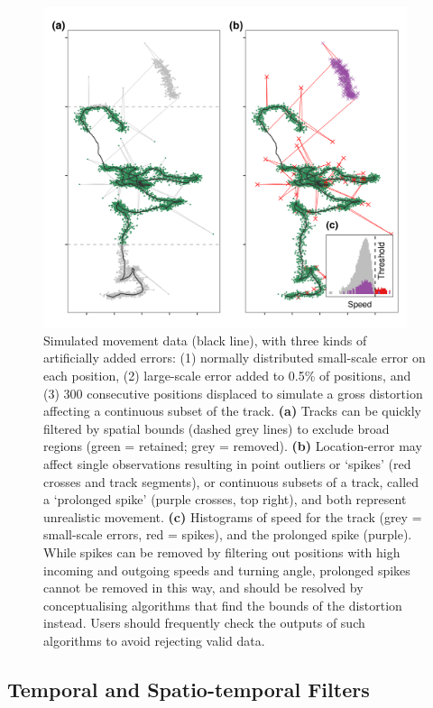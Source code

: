 \documentclass[10pt,paper=a4,headings=standardclasses
]{scrartcl}
\begin{document}
\begin{figure}[h!]
    \centering
    \includegraphics[width=0.95\textwidth]{figures/fig_02_filtering_data.png}
    \caption{Simulated movement data (black line), with three kinds of artificially added errors: (1) normally distributed small-scale error on each position, (2) large-scale error added to 0.5\% of positions, and (3) 300 consecutive positions displaced to simulate a gross distortion affecting a continuous subset of the track.  
    \textbf{(a)} Tracks can be quickly filtered by spatial bounds (dashed grey lines) to exclude broad regions (green = retained; grey = removed).
    \textbf{(b)} Location-error may affect single observations resulting in point outliers or `spikes' (red crosses and track segments), or continuous subsets of a track, called a `prolonged spike' (purple crosses, top right), and both represent unrealistic movement.
    \textbf{(c)} Histograms of speed for the track (grey = small-scale errors, red = spikes), and the prolonged spike (purple).
    While spikes can be removed by filtering out positions with high incoming and outgoing speeds and turning angle, prolonged spikes cannot be removed in this way, and should be resolved by conceptualising algorithms that find the bounds of the distortion instead.
    Users should frequently check the outputs of such algorithms to avoid rejecting valid data.
    }
    \label{fig:figure_filtering_data}
\end{figure}

\subsection{Temporal and Spatio-temporal Filters}
\end{document}
